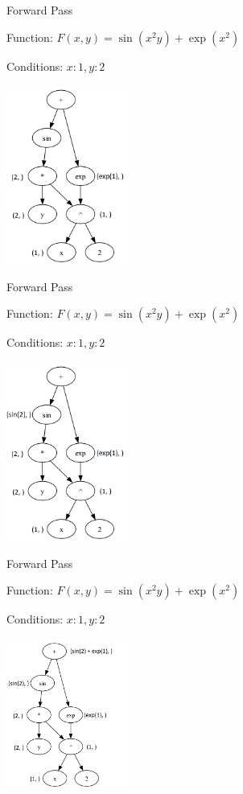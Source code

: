 \documentclass{beamer}
\begin{document}
\begin{frame}{Forward Pass}

Function: $F(x, y) = \sin(x^2 y) + \exp(x^2)$

Conditions: ${x:1, y:2}$
\begin{center}
        \includegraphics[width=4cm]{DAG_gif_images/fwd_1_fix_4.png}
\end{center}
\end{frame}

\begin{frame}{Forward Pass}

Function: $F(x, y) = \sin(x^2 y) + \exp(x^2)$

Conditions: ${x:1, y:2}$
\begin{center}
        \includegraphics[width=4cm]{DAG_gif_images/fwd_1_fix_5.png}
\end{center}
\end{frame}

\begin{frame}{Forward Pass}

Function: $F(x, y) = \sin(x^2 y) + \exp(x^2)$

Conditions: ${x:1, y:2}$
\begin{center}
        \includegraphics[width=4cm]{DAG_gif_images/fwd_1_fix_6.png}
\end{center}
\end{frame}
\end{document}
